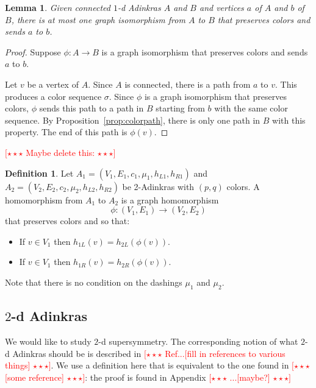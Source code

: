 \documentclass[12pt,twoside,singlespace]{article}
\numberwithin{equation}{section}
\newtheorem{lem}[equation]{Lemma}
\theoremstyle{definition}
\newtheorem{definition}[equation]{Definition}
\newcommand{\com}[1]{\textcolor{red}{$[\star \star \star$ #1 $\star \star \star]$}}
\begin{document}
\begin{lem}
\label{lem:uniqueiso}
Given connected $1$-d Adinkras $A$ and $B$ and vertices $a$ of $A$ and $b$ of $B$, there is at most one graph isomorphism from $A$ to $B$ that preserves colors and sends $a$ to $b$.
\end{lem}
\begin{proof}
Suppose $\phi:A\to B$ is a graph isomorphism that preserves colors and sends $a$ to $b$.

Let $v$ be a vertex of $A$. Since $A$ is connected, there is a path from $a$ to $v$.  This produces a color sequence $\sigma$.  Since $\phi$ is a graph isomorphism that preserves colors, $\phi$ sends this path to a path in $B$ starting from $b$ with the same color sequence.  By Proposition~\ref{prop:colorpath}, there is only one path in $B$ with this property.  The end of this path is $\phi(v)$.
\end{proof}


\com{Maybe delete this:}


\begin{definition}
Let 
$A_1=(V_1,E_1,c_1,\mu_1,h_{L1},h_{R1})$
and
$A_2=(V_2,E_2,c_2,\mu_2,h_{L2},h_{R2})$
be 2-Adinkras with $(p,q)$ colors.  A homomorphism from $A_1$ to $A_2$ is a graph homomorphism
\[\phi:(V_1,E_1)\to (V_2,E_2)\]
that preserves colors and so that:
\begin{itemize}
\item If $v\in V_1$ then $h_{1L}(v)=h_{2L}(\phi(v))$.
\item If $v\in V_1$ then $h_{1R}(v)=h_{2R}(\phi(v))$.
\end{itemize}
Note that there is no condition on the dashings $\mu_1$ and $\mu_2$.
\end{definition}




\subsection{$2$-d Adinkras}
We would like to study $2$-d supersymmetry. The corresponding notion of what $2$-d Adinkras should be is described in \com{Ref...[fill in references to various things]}.  We use a definition here that is equivalent to the one found in \com{[some reference]}: the proof is found in Appendix \com{...[maybe?]}
\end{document}
